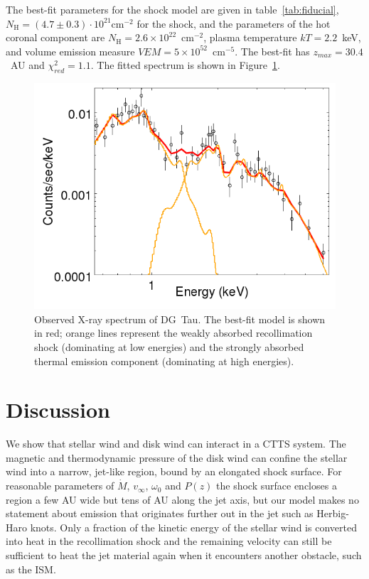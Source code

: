 \documentclass{emulateapj}
\begin{document}
The best-fit parameters for the shock model are given in table~\ref{tab:fiducial}, $N_\textrm{H}=(4.7\pm0.3)\cdot10^{21}\mathrm{ cm}^{-2}$ for the shock, and the parameters of the hot coronal component are $N_\textrm{H}=2.6\times10^{22}$~cm$^{-2}$, plasma temperature $kT = 2.2$~keV, and volume emission measure $VEM=5\times10^{52}$~cm$^{-5}$. The best-fit has $z_{max} = 30.4$~AU and $\chi^2_{red}= 1.1$. The fitted spectrum is shown in Figure~\ref{fig:fit}.

\begin{figure}[h!]
\begin{center}
\includegraphics[width=0.7\columnwidth]{figures/DGTaufit/DGTaufit.png}
\caption{\label{fig:fit}
Observed X-ray spectrum of DG~Tau. The best-fit model is shown in red; orange lines represent the weakly absorbed recollimation shock (dominating at low energies) and the strongly absorbed thermal emission component (dominating at high energies).}
\end{center}
\end{figure}

\section{Discussion}
\label{sect:discussion}
We show that stellar wind and disk wind can interact in a CTTS system. The magnetic and thermodynamic pressure of the disk wind can confine the stellar wind into a narrow, jet-like region, bound by an elongated shock surface. For reasonable parameters of $\dot M$, $v_\infty$, $\omega_0$ and $P(z)$ the shock surface encloses a region a few AU wide but tens of AU along the jet axis, but our model makes no statement about emission that originates further out in the jet such as Herbig-Haro knots. Only a fraction of the kinetic energy of the stellar wind is converted into heat in the recollimation shock and the remaining velocity can still be sufficient to heat the jet material again when it encounters another obstacle, such as the ISM.
\end{document}
